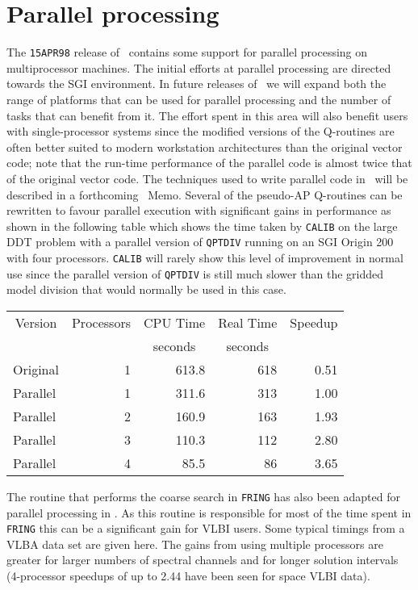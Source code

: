 \section{Parallel processing}

The {\tt 15APR98} release of \AIPS\ contains some support for parallel
processing on multiprocessor machines.
The initial efforts at parallel processing are directed towards the
SGI environment.  In future releases of \AIPS\ we will expand both the
range of platforms that can be used for parallel processing and the
number of tasks that can benefit from it.  The effort spent in this
area will also benefit users with single-processor systems since the
modified versions of the Q-routines are often better suited to modern
workstation architectures than the original vector code; note that the
run-time performance of the parallel code is almost twice that of the
original vector code.
The techniques used to write parallel code in \AIPS\ will be described
in a forthcoming \AIPS\ Memo.
Several of the pseudo-AP
Q-routines can be rewritten to favour parallel execution with
significant gains in performance as shown in the following table which
shows the time taken by {\tt CALIB} on the large DDT problem with a
parallel version of {\tt QPTDIV} running on an SGI Origin 200 with
four processors.  {\tt CALIB} will rarely show this level of
improvement in normal use since the parallel version of {\tt QPTDIV}
is still much slower than the gridded model division that would
normally be used in this case.

\begin{tabular}{|l|r|r|r|r|}
\hline
\multicolumn{1}{|c|}{Version} & \multicolumn{1}{c|}{Processors}
  & \multicolumn{1}{c|}{CPU Time} & \multicolumn{1}{c|}{Real Time}
  & \multicolumn{1}{c|}{Speedup} \\
  &  &  \multicolumn{1}{c|}{seconds} & \multicolumn{1}{c}{seconds} & \\
\hline
Original & 1 & 613.8 & 618 & 0.51 \\
Parallel & 1 & 311.6 & 313 & 1.00 \\
Parallel & 2 & 160.9 & 163 & 1.93 \\
Parallel & 3 & 110.3 & 112 & 2.80 \\
Parallel & 4 &  85.5 &  86 & 3.65 \\
\hline
\end{tabular}

The routine that performs the coarse search in {\tt FRING} has also
been adapted for parallel processing in \hbox{\AIPS}.  As this
routine is responsible for most of the time spent in {\tt FRING} this
can be a significant gain for VLBI users.  Some typical timings from a
VLBA data set are given here.  The gains from using multiple
processors are greater for larger numbers of spectral channels and for
longer solution intervals (4-processor speedups of up to 2.44 have
been seen for space VLBI data).

